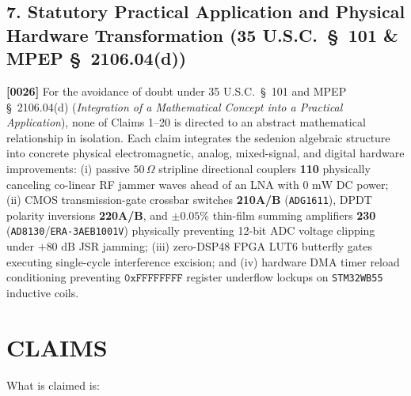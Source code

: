 \documentclass[12pt,letterpaper]{article}
\begin{document}
\subsection*{7. Statutory Practical Application and Physical Hardware Transformation (35 U.S.C.\ \S\ 101 \& MPEP \S\ 2106.04(d))}
\textbf{[0026]} For the avoidance of doubt under 35 U.S.C.\ \S\ 101 and MPEP \S\ 2106.04(d) (\textit{Integration of a Mathematical Concept into a Practical Application}), none of Claims 1--20 is directed to an abstract mathematical relationship in isolation. Each claim integrates the sedenion algebraic structure into concrete physical electromagnetic, analog, mixed-signal, and digital hardware improvements: (i) passive $50\,\Omega$ stripline directional couplers \textbf{110} physically canceling co-linear RF jammer waves ahead of an LNA with $0\text{ mW}$ DC power; (ii) CMOS transmission-gate crossbar switches \textbf{210A/B} (\texttt{ADG1611}), DPDT polarity inversions \textbf{220A/B}, and $\pm 0.05\%$ thin-film summing amplifiers \textbf{230} (\texttt{AD8130}/\texttt{ERA-3AEB1001V}) physically preventing 12-bit ADC voltage clipping under $+80\text{ dB}$ JSR jamming; (iii) zero-DSP48 FPGA LUT6 butterfly gates executing single-cycle interference excision; and (iv) hardware DMA timer reload conditioning preventing $\mathtt{0xFFFFFFFF}$ register underflow lockups on \texttt{STM32WB55} inductive coils.

\newpage
\section*{CLAIMS}
What is claimed is:
\end{document}
